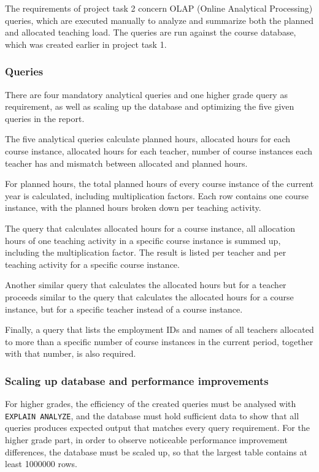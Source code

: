 \documentclass[a4paper]{scrartcl}
\renewcommand{\_}{\textunderscore\allowbreak}
\begin{document}
The requirements of project task 2 concern OLAP (Online Analytical Processing) queries, which are executed manually to analyze and summarize both the planned and allocated teaching load. The queries are run against the course database, which was created earlier in project task 1. 

\subsubsection{Queries}
There are four mandatory analytical queries and one higher grade query as requirement, as well as scaling up the database and optimizing the five given queries in the report. 

The five analytical queries calculate planned hours, allocated hours for each course instance, allocated hours for each teacher, number of course instances each teacher has and mismatch between allocated and planned hours.

For planned hours, the total planned hours of every course instance of the current year is calculated, including multiplication factors. Each row contains one course instance, with the planned hours broken down per teaching activity. 

The query that calculates allocated hours for a course instance, all allocation hours of one teaching activity in a specific course instance is summed up, including the multiplication factor. The result is listed per teacher and per teaching activity for a specific course instance.

Another similar query that calculates the allocated hours but for a teacher proceeds similar to the query that calculates the allocated hours for a course instance, but for a specific teacher instead of a course instance.

Finally, a query that lists the employment IDs and names of all teachers allocated to more than a specific number of course instances in the current period, together with that number, is also required.

\subsubsection{Scaling up database and performance improvements}

For higher grades, the efficiency of the created queries must be analysed with \texttt{EXPLAIN ANALYZE}, and the database must hold sufficient data to show that all queries produces expected output that matches every query requirement. For the higher grade part, in order to observe noticeable performance improvement differences, the database must be scaled up, so that the largest table contains at least 1000000 rows.
\end{document}
